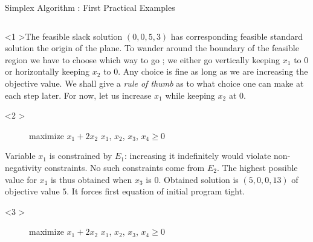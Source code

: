 \documentclass[aspectratio = 169]{beamer}
\begin{document}
\begin{frame}{Simplex Algorithm : First Practical Examples}
    \begin{columns}
        \begin{column}{.5\textwidth}
            \begin{onlyenv}<1
              >The feasible slack solution $(0, 0, 5, 3)$ has
              corresponding feasible standard solution the origin of
              the plane. To wander around the boundary of the feasible
              region we have to choose which way to go ; we either go
              vertically keeping $x_1$ to $0$ or horizontally keeping
              $x_2$ to $0$. Any choice is fine as long as we are
              increasing the objective value. We shall give a
              \textit{rule of thumb} as to what choice one can make at
              each step later. For now, let us increase $x_1$ while
              keeping $x_2$ at $0$.
            \end{onlyenv}
            \begin{onlyenv}<2
              >
              \begin{figure}
                \small{
                  \begin{linearProg}{
                      maximize
                    }{
                      $x_1 + 2x_2$
                    }{
                    }{
                      $x_1$, $x_2$, $x_3$, $x_4 \geq 0$
                    }
                  \end{linearProg}
                }
              \end{figure}
              Variable $x_1$ is constrained by $E_1$: increasing it
              indefinitely would violate non-negativity
              constraints. No such constraints come from $E_2$. The
              highest possible value for $x_1$ is thus obtained when
              $x_3$ is $0$. Obtained solution is $(5, 0, 0, 13)$ of
              objective value $5$. It forces first equation of initial
              program tight.
            \end{onlyenv}
            \begin{onlyenv}<3
              >
              \begin{figure}
                \small{
                  \begin{linearProg}{
                      maximize
                    }{
                      $x_1 + 2x_2$
                    }{
                    }{
                      $x_1$, $x_2$, $x_3$, $x_4 \geq 0$
                    }

\end{linearProg}}
\end{figure}
\end{onlyenv}
\end{column}
\end{columns}
\end{frame}
\end{document}
